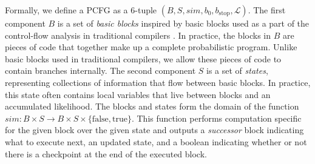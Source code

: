 \documentclass[runningheads]{llncs}
\begin{document}
Formally, we define a PCFG as a 6-tuple $(B,S,\mathit{sim},b_0,b_\text{stop},\mathcal{L})$.
The first component $B$ is a set of \emph{basic blocks} inspired by basic blocks used as a part of the control-flow analysis in traditional compilers \cite{aho2006compilers}.
In practice, the blocks in $B$ are pieces of code that together make up a complete probabilistic program.
Unlike basic blocks used in traditional compilers, we allow these pieces of code to contain branches internally.
The second component $S$ is a set of \emph{states}, representing collections of information that flow between basic blocks.
In practice, this state often contains local variables that live between blocks and an accumulated likelihood.
The blocks and states form the domain of the function $\mathit{sim}: B \times S \rightarrow B \times S \times \{\text{false},\text{true}\}$.
This function performs computation specific for the given block over the given state and outputs a \emph{successor} block indicating what to execute next, an updated state, and a boolean indicating whether or not there is a checkpoint at the end of the executed block.
\end{document}
